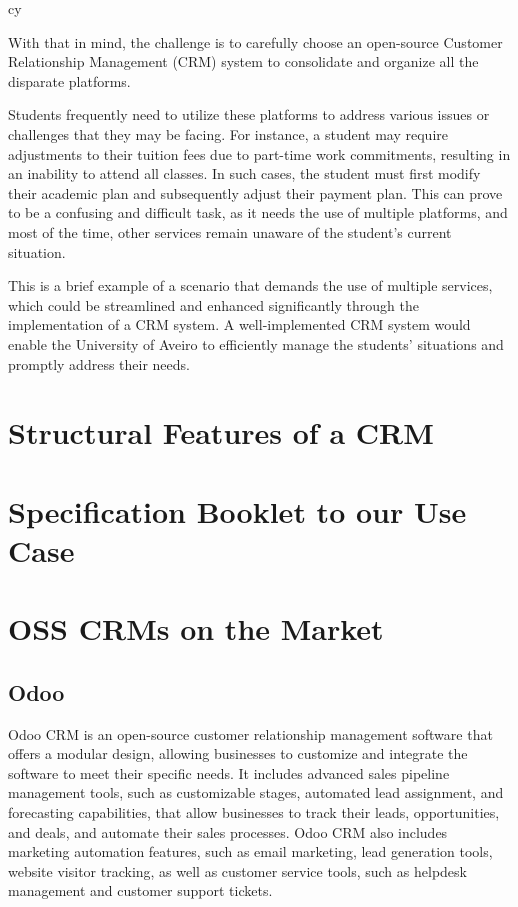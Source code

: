 cy\documentclass{article}
\begin{document}
With that in mind, the challenge is to carefully choose an open-source Customer Relationship Management (CRM) system to consolidate and organize all the disparate platforms.

Students frequently need to utilize these platforms to address various issues or challenges that they may be facing. For instance, a student may require adjustments to their tuition fees due to part-time work commitments, resulting in an inability to attend all classes. In such cases, the student must first modify their academic plan and subsequently adjust their payment plan. This can prove to be a confusing and difficult task, as it needs the use of multiple platforms, and most of the time, other services remain unaware of the student's current situation.

This is a brief example of a scenario that demands the use of multiple services, which could be streamlined and enhanced significantly through the implementation of a CRM system. A well-implemented CRM system would enable the University of Aveiro to efficiently manage the students' situations and promptly address their needs.

\section{Structural Features of a CRM}

\section{Specification Booklet to our Use Case}

\section{OSS CRMs on the Market}

\subsection{Odoo}

Odoo CRM is an open-source customer relationship management software that offers a modular design, allowing businesses to customize and integrate the software to meet their specific needs. It includes advanced sales pipeline management tools, such as customizable stages, automated lead assignment, and forecasting capabilities, that allow businesses to track their leads, opportunities, and deals, and automate their sales processes. Odoo CRM also includes marketing automation features, such as email marketing, lead generation tools, website visitor tracking, as well as customer service tools, such as helpdesk management and customer support tickets.
\end{document}
